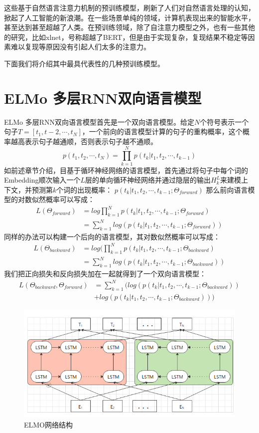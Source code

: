 \documentclass[twoside,a4paper,12pt]{book}%
\begin{document}
这些基于自然语言注意力机制的预训练模型，刷新了人们对自然语言处理的认知，掀起了人工智能的新浪潮。在一些场景单纯的领域，计算机表现出来的智能水平，甚至达到甚至超越了人类。在预训练领域，除了自注意力模型之外，也有一些其他的研究，比如xlnet，号称超越了\gls{BERT}，但是由于实现复杂，复现结果不稳定等因素难以复现等原因没有引起人们太多的注意力。

下面我们将介绍其中最具代表性的几种预训练模型。

\section{ELMo 多层RNN双向语言模型}
ELMo 多层\gls{RNN}双向语言模型首先是一个双向语言模型。给定$N$个符号表示一个句子$T=[t_1,t-2,\cdots,t_N]$，一个前向的语言模型计算的句子的重构概率，这个概率越高表示句子越通顺，否则表示句子越不通顺。
$$
p(t_1,t_2,\cdots,t_N)=\prod_{k=1}^N{p(t_k|t_1,t_2,\cdots,t_{k-1})}
$$
如前述章节介绍，目基于循环神经网络的语言模型，首先通过将句子中每个词的Embedding顺次输入一个$L$层的单向循环神经网络并通过隐层的输出$H_k^L$来建模上下文，并预测第$k$个词的出现概率：
$
p(t_k|t_1,t_2,\cdots,t_{k-1};\Theta_{forward}) 
$
那么前向语言模型的对数似然概率可以写成：
$$
\begin{aligned}
L(\Theta_{forward})&=log\prod_{k=1}^Np(t_k|t_1,t_2,\cdots,t_{k-1};\Theta_{forward}) \\
&=\sum_{k=1}^N{log(p(t_k|t_1,t_2,\cdots,t_{k-1};\Theta_{forward}))}
\end{aligned}
$$
同样的办法可以构建一个后向的语言模型，其对数似然概率可以写成：
$$
\begin{aligned}
L(\Theta_{backward})&=log(\prod_{k=1}^Np(t_k|t_1,t_2,\cdots,t_{k-1};\Theta_{backward}) \\
&=\sum_{k=1}^N{log(p(t_k|t_1,t_2,\cdots,t_{k-1};\Theta_{backward}))}
\end{aligned}
$$
我们把正向损失和反向损失加在一起就得到了一个双向语言模型：
$$
\begin{aligned}
L(\Theta_{backward},\Theta_{forward}) 
&= \sum_{k=1}^N 
(
    log(p(t_k|t_1,t_2,\cdots,t_{k-1};\Theta_{backward})) \\
& + log(p(t_k|t_1,t_2,\cdots,t_{k-1};\Theta_{backward}))
)
\end{aligned}
$$
\begin{figure}[htbp]
\begin{center}
\includegraphics[width=5.6in]{figures/elmo1.png}
\caption{ELMO网络结构}
\label{fig:elmo1}
\end{center}
\end{figure}
\end{document}
